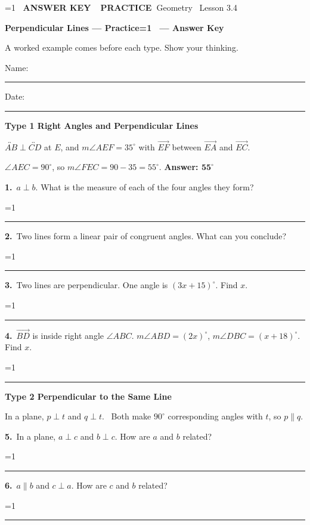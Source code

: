 \documentclass[11pt,letterpaper]{article}
\newcommand{\badge}[1]{\colorbox{fmtitle}{\color{white}\bfseries\small\ #1\ }}
\newcommand{\topicbar}[1]{\needspace{4.5cm}\par\vspace{5mm}
  \begin{tcolorbox}[enhanced,colback=fmtitle,colframe=fmtitle,arc=2mm,left=4mm,top=1.5mm,bottom=1.5mm]
  \color{white}\bfseries\large #1
  \end{tcolorbox}}
\providecommand{\iskey}{0}
\newcommand{\pans}[2][3.2cm]{\ifnum\iskey=1 \underline{\makebox[#1][c]{\color{fmmistake}\bfseries #2}}\else\rule{#1}{0.4pt}\fi}
\newcommand{\sdp}[3]{\begin{minipage}[t][2.4cm]{0.48\linewidth}{\color{fmturn}\bfseries #1.}\ #2\par\vfill\hfill \pans[3.6cm]{#3}\end{minipage}}
\newcommand{\algp}[3]{\begin{minipage}[t][4.6cm]{0.48\linewidth}{\color{fmturn}\bfseries #1.}\ #2\par\vfill\hfill \pans[4.2cm]{#3}\end{minipage}}
\newlength{\pw}
\renewcommand{\pans}[2][3.2cm]{\ifnum\iskey=1 \settowidth{\pw}{\bfseries #2}\ifdim\pw>#1 \parbox[b]{#1}{\raggedleft\color{fmmistake}\bfseries\small #2}\else\underline{\makebox[#1][c]{\color{fmmistake}\bfseries #2}}\fi\else\rule{#1}{0.4pt}\fi}
\begin{document}
\ifnum\iskey=1 \colorbox{fmwatch}{\color{white}\bfseries\small\ ANSWER KEY\ }\else\badge{PRACTICE}\fi\hfill{\small\color{fmgray}Geometry \textperiodcentered\ Lesson 3.4}\par\vspace{4mm}
{\color{fmtitle}\LARGE\bfseries Perpendicular Lines --- Practice\ifnum\iskey=1 \ --- Answer Key\fi}\par\vspace{1mm}
{\color{fmgray}A worked example comes before each type. Show your thinking.}\par\vspace{3mm}
Name: \rule{6cm}{0.4pt}\hspace{1cm}Date: \rule{3.5cm}{0.4pt}\par\vspace{2mm}


\needspace{6cm}\topicbar{Type 1 \quad Right Angles and Perpendicular Lines}
\begin{watchme}$\overleftrightarrow{AB} \perp \overleftrightarrow{CD}$ at $E$, and $m\angle AEF = 35^\circ$ with $\overrightarrow{EF}$ between $\overrightarrow{EA}$ and $\overrightarrow{EC}$.\par
$\angle AEC = 90^\circ$, so $m\angle FEC = 90 - 35 = 55^\circ$. \quad \textbf{Answer: $\boldsymbol{55^\circ}$}\end{watchme}
\needspace{3.4cm}\noindent\sdp{1}{$a \perp b$. What is the measure of each of the four angles they form?}{$90^\circ$}\hfill\sdp{2}{Two lines form a linear pair of congruent angles. What can you conclude?}{the lines are perpendicular}\par\vspace{2mm}
\needspace{4.6cm}\noindent\algp{3}{Two lines are perpendicular. One angle is $(3x + 15)^\circ$. Find $x$.}{$x = 25$}\hfill\algp{4}{$\overrightarrow{BD}$ is inside right angle $\angle ABC$. $m\angle ABD = (2x)^\circ$, $m\angle DBC = (x + 18)^\circ$. Find $x$.}{$x = 24$}\par

\needspace{6cm}\topicbar{Type 2 \quad Perpendicular to the Same Line}
\begin{watchme}In a plane, $p \perp t$ and $q \perp t$. \ Both make $90^\circ$ corresponding angles with $t$, so $p \parallel q$.\end{watchme}
\needspace{3.4cm}\noindent\sdp{5}{In a plane, $a \perp c$ and $b \perp c$. How are $a$ and $b$ related?}{$a \parallel b$}\hfill\sdp{6}{$a \parallel b$ and $c \perp a$. How are $c$ and $b$ related?}{$c \perp b$}\par
\end{document}
